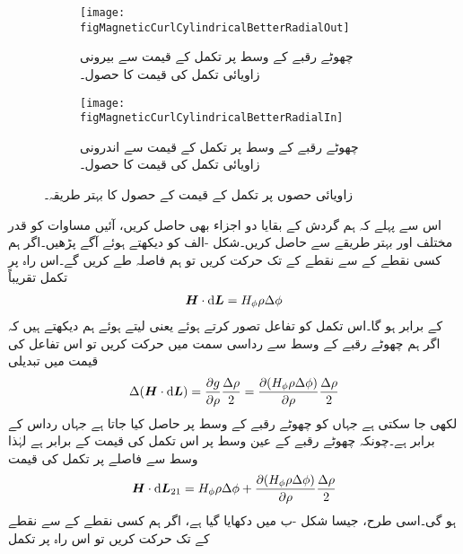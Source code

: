 \begin{figure}
\centering
\begin{subfigure}{0.5\textwidth}
\centering
\texttt{[image: figMagneticCurlCylindricalBetterRadialOut]}
\caption{چھوٹے رقبے کے وسط پر تکمل کے قیمت سے بیرونی زاویائی تکمل کی قیمت کا حصول۔}
\end{subfigure}%
%
\begin{subfigure}{0.5\textwidth}
\centering
\texttt{[image: figMagneticCurlCylindricalBetterRadialIn]}
\caption{چھوٹے رقبے کے وسط پر تکمل کے قیمت سے اندرونی زاویائی تکمل کی قیمت کا حصول۔}
\end{subfigure}%
\caption{زاویائی حصوں پر تکمل کے قیمت کے حصول کا بہتر طریقہ۔}
\label{شکل_مقناطیسی_بہتر_گردش_نلکی}
\end{figure}
اس سے پہلے کہ ہم گردش کے بقایا دو اجزاء بھی حاصل کریں، آئیں مساوات  کو قدر مختلف اور بہتر طریقے سے حاصل کریں۔شکل -الف کو دیکھتے ہوئے آگے پڑھیں۔اگر ہم کسی نقطے  کے   سے نقطے کے  تک حرکت کریں تو ہم   فاصلہ طے کریں گے۔اس راہ پر تکمل تقریباً
\begin{align*}
\kvec{H} \cdot \dif \kvec{L}=H_{\phi}\rho \Delta \phi
\end{align*}
 کے برابر ہو گا۔اس تکمل کو تفاعل  تصور کرتے ہوئے  یعنی  لیتے ہوئے  ہم دیکھتے ہیں کہ اگر ہم چھوٹے رقبے کے وسط سے رداسی سمت میں   حرکت کریں تو اس تفاعل کی قیمت میں تبدیلی
\begin{align*}
\Delta (\kvec{H} \cdot \dif \kvec{L})=\frac{\partial g}{\partial \rho}\frac{\Delta \rho}{2}=\frac{\partial (H_{\phi}\rho \Delta \phi)}{\partial \rho} \frac{\Delta \rho}{2}
\end{align*}
لکھی جا سکتی ہے جہاں  کو چھوٹے رقبے کے وسط پر حاصل کیا جاتا ہے جہاں رداس  کے برابر ہے۔چونکہ چھوٹے رقبے کے عین وسط پر اس تکمل کی قیمت  کے برابر ہے لہٰذا وسط سے  فاصلے پر تکمل کی قیمت
\begin{align}\label{مساوات_مقناطیسی_نلکی_ایک_دو}
\kvec{H} \cdot \dif \kvec{L}_{21}=H_{\phi}\rho \Delta \phi+\frac{\partial (H_{\phi}\rho \Delta \phi)}{\partial \rho} \frac{\Delta \rho}{2}
\end{align}
ہو گی۔اسی طرح، جیسا شکل -ب میں دکھایا گیا ہے، اگر ہم کسی نقطے کے   سے نقطے کے   تک حرکت کریں تو اس راہ پر تکمل
